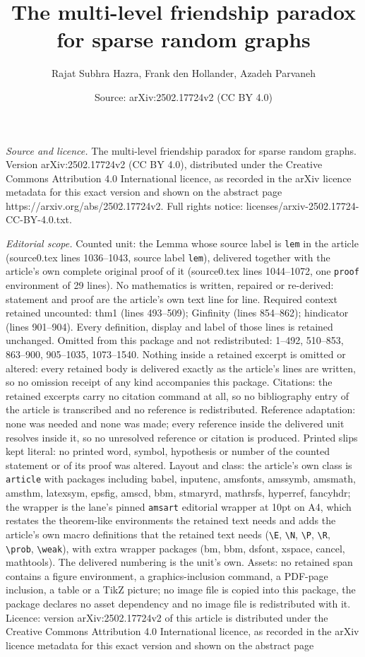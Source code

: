 \documentclass[10pt,a4paper]{amsart}
\title[The multi-level friendship paradox for sparse random graphs]{The multi-level friendship paradox for sparse random graphs}
\author{Rajat Subhra Hazra, Frank den Hollander, Azadeh Parvaneh}
\date{Source: arXiv:2502.17724v2 (CC BY 4.0)}
\begin{document}
\maketitle

\noindent\emph{Source and licence.} The multi-level friendship paradox for sparse random graphs. Version arXiv:2502.17724v2 (CC BY 4.0), distributed under the Creative Commons Attribution 4.0 International licence, as recorded in the arXiv licence metadata for this exact version and shown on the abstract page https://arxiv.org/abs/2502.17724v2. Full rights notice: licenses/arxiv-2502.17724-CC-BY-4.0.txt.\par\smallskip

\noindent\textit{Editorial scope.} Counted unit: the Lemma whose source label is \texttt{lem} in the article (source0.tex lines 1036--1043, source label \texttt{lem}), delivered together with the article's own complete original proof of it (source0.tex lines 1044--1072, one \texttt{proof} environment of 29 lines). No mathematics is written, repaired or re-derived: statement and proof are the article's own text line for line. Required context retained uncounted: thm1 (lines 493--509); Ginfinity (lines 854--862); hindicator (lines 901--904). Every definition, display and label of those lines is retained unchanged. Omitted from this package and not redistributed: 1--492, 510--853, 863--900, 905--1035, 1073--1540. Nothing inside a retained excerpt is omitted or altered: every retained body is delivered exactly as the article's lines are written, so no omission receipt of any kind accompanies this package. Citations: the retained excerpts carry no citation command at all, so no bibliography entry of the article is transcribed and no reference is redistributed. Reference adaptation: none was needed and none was made; every reference inside the delivered unit resolves inside it, so no unresolved reference or citation is produced. Printed slips kept literal: no printed word, symbol, hypothesis or number of the counted statement or of its proof was altered. Layout and class: the article's own class is \texttt{article} with packages including babel, inputenc, amsfonts, amssymb, amsmath, amsthm, latexsym, epsfig, amscd, bbm, stmaryrd, mathrsfs, hyperref, fancyhdr; the wrapper is the lane's pinned \texttt{amsart} editorial wrapper at 10pt on A4, which restates the theorem-like environments the retained text needs and adds the article's own macro definitions that the retained text needs (\texttt{\textbackslash E}, \texttt{\textbackslash N}, \texttt{\textbackslash P}, \texttt{\textbackslash R}, \texttt{\textbackslash prob}, \texttt{\textbackslash weak}), with extra wrapper packages (bm, bbm, dsfont, xspace, cancel, mathtools). The delivered numbering is the unit's own. Assets: no retained span contains a figure environment, a graphics-inclusion command, a PDF-page inclusion, a table or a TikZ picture; no image file is copied into this package, the package declares no asset dependency and no image file is redistributed with it. Licence: version arXiv:2502.17724v2 of this article is distributed under the Creative Commons Attribution 4.0 International licence, as recorded in the arXiv licence metadata for this exact version and shown on the abstract page 
\end{document}

